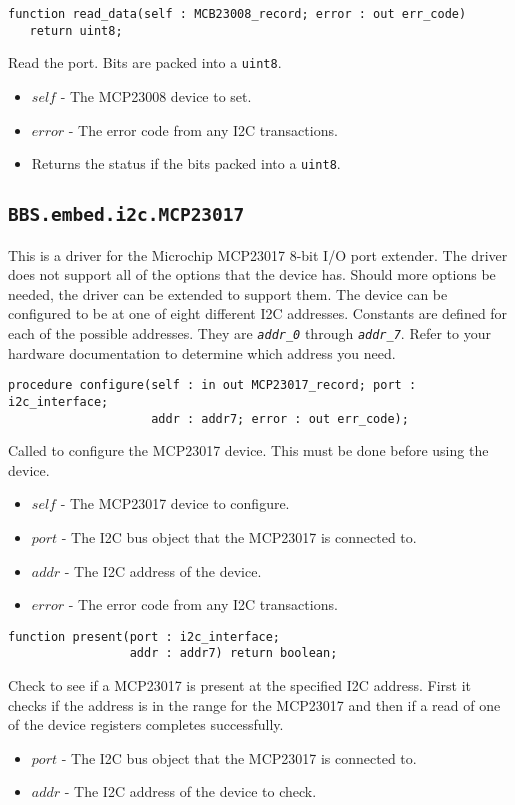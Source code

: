 \documentclass[10pt, openany]{book}
\newcommand{\indexfunc}[1]{\index[func]{#1}}
\newcommand{\package}[1]{\texttt{#1}}
\newcommand{\constant}[1]{\emph{\texttt{#1}}}
\newcommand{\datatype}[1]{\texttt{#1}}
\begin{document}
\begin{lstlisting}
function read_data(self : MCB23008_record; error : out err_code)
   return uint8;
\end{lstlisting}
\indexfunc{read\_data}
Read the port.  Bits are packed into a \datatype{uint8}.
\begin{itemize}
  \item $self$ - The MCP23008 device to set.
  \item $error$ - The error code from any I2C transactions.
  \item Returns the status if the bits packed into a \datatype{uint8}.
\end{itemize}

\subsection{\package{BBS.embed.i2c.MCP23017}}
This is a driver for the Microchip MCP23017 8-bit I/O port extender\cite{MCP23017}.  The driver does not support all of the options that the device has.  Should more options be needed, the driver can be extended to support them.  The device can be configured to be at one of eight different I2C addresses.  Constants are defined for each of the possible addresses.  They are \constant{addr\_0} through \constant{addr\_7}.  Refer to your hardware documentation to determine which address you need.

\begin{lstlisting}
procedure configure(self : in out MCP23017_record; port : i2c_interface;
                    addr : addr7; error : out err_code);
\end{lstlisting}
\indexfunc{configure}
Called to configure the MCP23017 device.  This must be done before using the device.
\begin{itemize}
  \item $self$ - The MCP23017 device to configure.
  \item $port$ - The I2C bus object that the MCP23017 is connected to.
  \item $addr$ - The I2C address of the device.
  \item $error$ - The error code from any I2C transactions.
\end{itemize}

\begin{lstlisting}
function present(port : i2c_interface;
                 addr : addr7) return boolean;
\end{lstlisting}
\indexfunc{present}
Check to see if a MCP23017 is present at the specified I2C address.  First it checks if the address is in the range for the MCP23017 and then if a read of one of the device registers completes successfully.
\begin{itemize}
  \item $port$ - The I2C bus object that the MCP23017 is connected to.
  \item $addr$ - The I2C address of the device to check.
\end{itemize}
\end{document}
